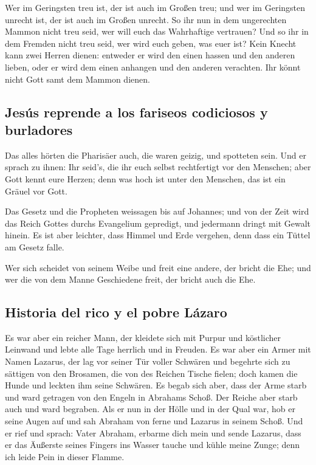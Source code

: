  Wer im Geringsten treu ist, der ist auch im Großen treu;
und wer im Geringsten unrecht ist, der ist auch im Großen unrecht.
 So ihr nun in dem ungerechten Mammon nicht treu seid,
wer will euch das Wahrhaftige vertrauen?  Und so ihr in
dem Fremden nicht treu seid, wer wird euch geben, was euer ist?
 Kein Knecht kann zwei Herren dienen: entweder er wird
den einen hassen und den anderen lieben, oder er wird dem einen anhangen
und den anderen verachten. Ihr könnt nicht Gott samt dem Mammon dienen.

\hypertarget{jesuxfas-reprende-a-los-fariseos-codiciosos-y-burladores}{%
\subsection{Jesús reprende a los fariseos codiciosos y
burladores}\label{jesuxfas-reprende-a-los-fariseos-codiciosos-y-burladores}}

 Das alles hörten die Pharisäer auch, die waren geizig,
und spotteten sein.  Und er sprach zu ihnen: Ihr seid's,
die ihr euch selbst rechtfertigt vor den Menschen; aber Gott kennt eure
Herzen; denn was hoch ist unter den Menschen, das ist ein Gräuel vor
Gott.

 Das Gesetz und die Propheten weissagen bis auf Johannes;
und von der Zeit wird das Reich Gottes durchs Evangelium gepredigt, und
jedermann dringt mit Gewalt hinein.  Es ist aber
leichter, dass Himmel und Erde vergehen, denn dass ein Tüttel am Gesetz
falle.

 Wer sich scheidet von seinem Weibe und freit eine
andere, der bricht die Ehe; und wer die von dem Manne Geschiedene freit,
der bricht auch die Ehe.

\hypertarget{historia-del-rico-y-el-pobre-luxe1zaro}{%
\subsection{Historia del rico y el pobre
Lázaro}\label{historia-del-rico-y-el-pobre-luxe1zaro}}

 Es war aber ein reicher Mann, der kleidete sich mit
Purpur und köstlicher Leinwand und lebte alle Tage herrlich und in
Freuden.  Es war aber ein Armer mit Namen Lazarus, der
lag vor seiner Tür voller Schwären  und begehrte sich zu
sättigen von den Brosamen, die von des Reichen Tische fielen; doch kamen
die Hunde und leckten ihm seine Schwären.  Es begab sich
aber, dass der Arme starb und ward getragen von den Engeln in Abrahams
Schoß. Der Reiche aber starb auch und ward begraben.  Als
er nun in der Hölle und in der Qual war, hob er seine Augen auf und sah
Abraham von ferne und Lazarus in seinem Schoß.  Und er
rief und sprach: Vater Abraham, erbarme dich mein und sende Lazarus,
dass er das Äußerste seines Fingers ins Wasser tauche und kühle meine
Zunge; denn ich leide Pein in dieser Flamme.

